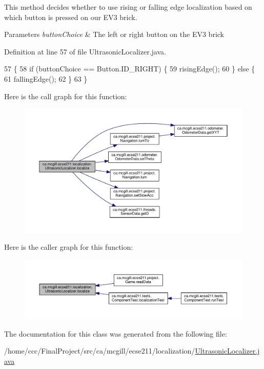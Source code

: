 This method decides whether to use rising or falling edge localization based on which button is pressed on our E\+V3 brick.


\begin{DoxyParams}{Parameters}
{\em button\+Choice} & The left or right button on the E\+V3 brick \\
\hline
\end{DoxyParams}


Definition at line 57 of file Ultrasonic\+Localizer.\+java.


\begin{DoxyCode}
57                                          \{
58     \textcolor{keywordflow}{if} (buttonChoice == Button.ID\_RIGHT) \{
59       risingEdge();
60     \} \textcolor{keywordflow}{else} \{
61       fallingEdge();
62     \}
63   \}
\end{DoxyCode}
Here is the call graph for this function\+:
\nopagebreak
\begin{figure}[H]
\begin{center}
\leavevmode
\includegraphics[width=350pt]{classca_1_1mcgill_1_1ecse211_1_1localization_1_1_ultrasonic_localizer_ab78196997d7409aec0c35603686989ad_cgraph}
\end{center}
\end{figure}
Here is the caller graph for this function\+:
\nopagebreak
\begin{figure}[H]
\begin{center}
\leavevmode
\includegraphics[width=350pt]{classca_1_1mcgill_1_1ecse211_1_1localization_1_1_ultrasonic_localizer_ab78196997d7409aec0c35603686989ad_icgraph}
\end{center}
\end{figure}


The documentation for this class was generated from the following file\+:\begin{DoxyCompactItemize}
\item 
/home/ccc/\+Final\+Project/src/ca/mcgill/ecse211/localization/\hyperlink{_ultrasonic_localizer_8java}{Ultrasonic\+Localizer.\+java}\end{DoxyCompactItemize}
